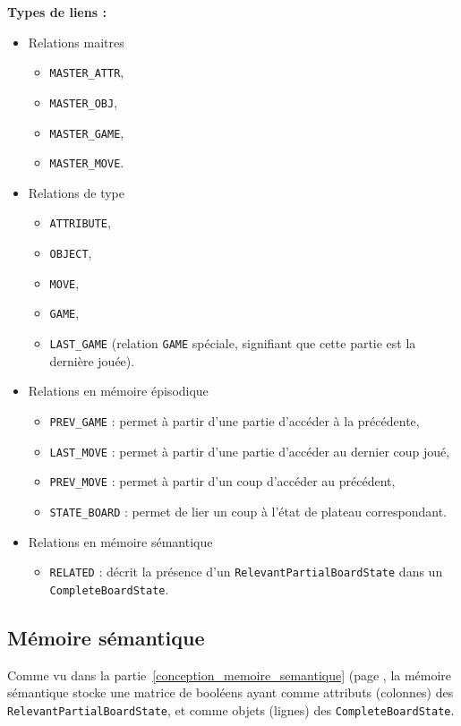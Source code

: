 \textbf{Types de liens :}
\begin{itemize}
	\item Relations maitres
		\begin{itemize}
			\item \texttt{MASTER\_ATTR},
			\item \texttt{MASTER\_OBJ},
			\item \texttt{MASTER\_GAME},
			\item \texttt{MASTER\_MOVE}.
		\end{itemize}
	\item Relations de type
		\begin{itemize}
			\item \texttt{ATTRIBUTE},
			\item \texttt{OBJECT},
			\item \texttt{MOVE},
			\item \texttt{GAME},
			\item \texttt{LAST\_GAME} (relation \texttt{GAME} spéciale, signifiant que cette partie est la dernière jouée).
		\end{itemize}
	\item Relations en mémoire épisodique
		\begin{itemize}
			\item \texttt{PREV\_GAME} : permet à partir d'une partie d'accéder à la précédente,
			\item \texttt{LAST\_MOVE} : permet à partir d'une partie d'accéder au dernier coup joué,
			\item \texttt{PREV\_MOVE} : permet à partir d'un coup d'accéder au précédent,
			\item \texttt{STATE\_BOARD} : permet de lier un coup à l'état de plateau correspondant.
		\end{itemize}
	\item Relations en mémoire sémantique
		\begin{itemize}
			\item \texttt{RELATED} : décrit la présence d'un \texttt{\gls{RelevantPartialBoardState}} dans un \texttt{\gls{CompleteBoardState}}.
		\end{itemize}
	\end{itemize}
	
\subsection{Mémoire sémantique}
Comme vu dans la partie~\ref{conception_memoire_semantique} (page \pageref{conception_memoire_semantique}, la mémoire sémantique stocke une matrice de booléens ayant comme attributs (colonnes) des \texttt{\gls{RelevantPartialBoardState}}, et comme objets (lignes) des \texttt{\gls{CompleteBoardState}}.

